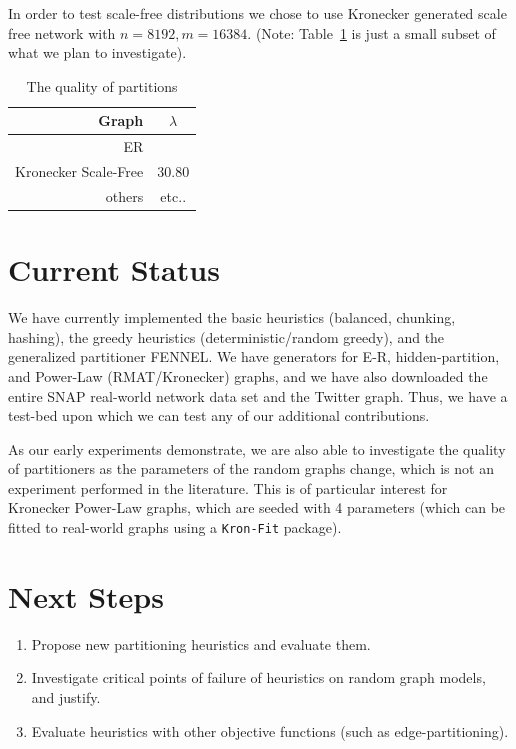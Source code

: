 \documentclass[11pt]{article}
\begin{document}
In order to test scale-free distributions we chose to use Kronecker generated scale free network with $n=8192, m=16384$. (Note: Table~\ref{table:quality} is just a small subset of what we plan to investigate).

\begin{table}[h]
\centering
\caption{The quality of partitions}
\label{table:quality}
\begin{tabular}{r | c}\hline
Graph & $\lambda$ \\ \hline
ER & \\
Kronecker Scale-Free & 30.80\\
others & etc..\\
\end{tabular}
\end{table}
\newpage
\section{Current Status}
We have currently implemented the basic heuristics (balanced, chunking, hashing), the greedy heuristics (deterministic/random greedy), and the generalized partitioner FENNEL. We have generators for E-R, hidden-partition, and Power-Law (RMAT/Kronecker) graphs, and we have also downloaded the entire SNAP real-world network data set and the Twitter graph. Thus, we have a test-bed upon which we can test any of our additional contributions. 

As our early experiments demonstrate, we are also able to investigate the quality of partitioners as the parameters of the random graphs change, which is not an experiment performed in the literature. This is of particular interest for Kronecker Power-Law graphs, which are seeded with 4 parameters (which can be fitted to real-world graphs using a \texttt{Kron-Fit}  package).

\section{Next Steps}
\begin{enumerate}
\item Propose new partitioning heuristics and evaluate them.
\item Investigate critical points of failure of heuristics on random graph models, and justify.
\item Evaluate heuristics with other objective functions (such as edge-partitioning).
\end{enumerate}
\end{document}
